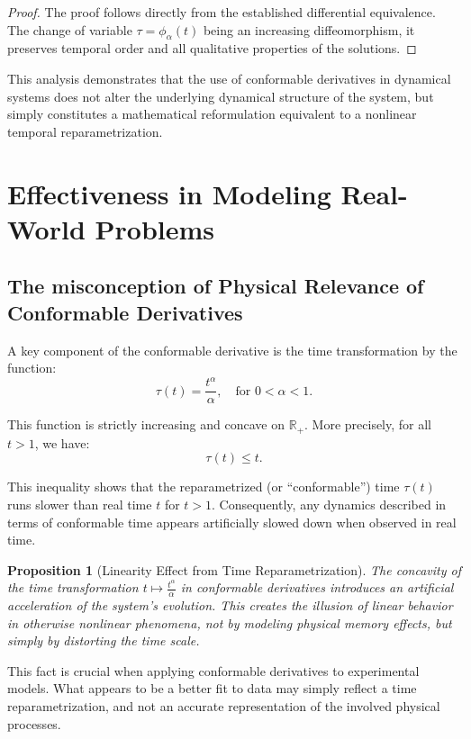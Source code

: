 \documentclass[preprint,12pt]{elsarticle}
\newtheorem{proposition}{Proposition}
\newtheorem{proof}{Proof}
\begin{document}
\begin{proof}
The proof follows directly from the established differential equivalence. The change of variable $\tau = \phi_\alpha(t)$ being an increasing diffeomorphism, it preserves temporal order and all qualitative properties of the solutions.
\end{proof}

This analysis demonstrates that the use of conformable derivatives in dynamical systems does not alter the underlying dynamical structure of the system, but simply constitutes a mathematical reformulation equivalent to a nonlinear temporal reparametrization.

\section{Effectiveness in Modeling Real-World Problems}

\subsection{The misconception of Physical Relevance of Conformable Derivatives}

A key component of the conformable derivative is the time transformation by the function:
\[
\tau(t) = \frac{t^{\alpha}}{\alpha}, \quad \text{for } 0 < \alpha < 1.
\]

This function is strictly increasing and concave on \( \mathbb{R}_+ \). More precisely, for all \( t > 1 \), we have:
\[
\tau(t) \leq t.
\]

This inequality shows that the reparametrized (or “conformable”) time $ \tau(t) $ runs slower than real time $t$ for $t>1$. Consequently, any dynamics described in terms of conformable time appears artificially slowed down when observed in real time.

\begin{proposition}[Linearity Effect from Time Reparametrization] The concavity of the time transformation \( t \mapsto \frac{t^{\alpha}}{\alpha} \) in conformable derivatives introduces an artificial acceleration of the system's evolution. This creates the illusion of linear behavior in otherwise nonlinear phenomena, not by modeling physical memory effects, but simply by distorting the time scale.
\end{proposition}

\noindent
This fact is crucial when applying conformable derivatives to experimental models. What appears to be a better fit to data may simply reflect a time reparametrization, and not an accurate representation of the involved physical processes.
\end{document}
